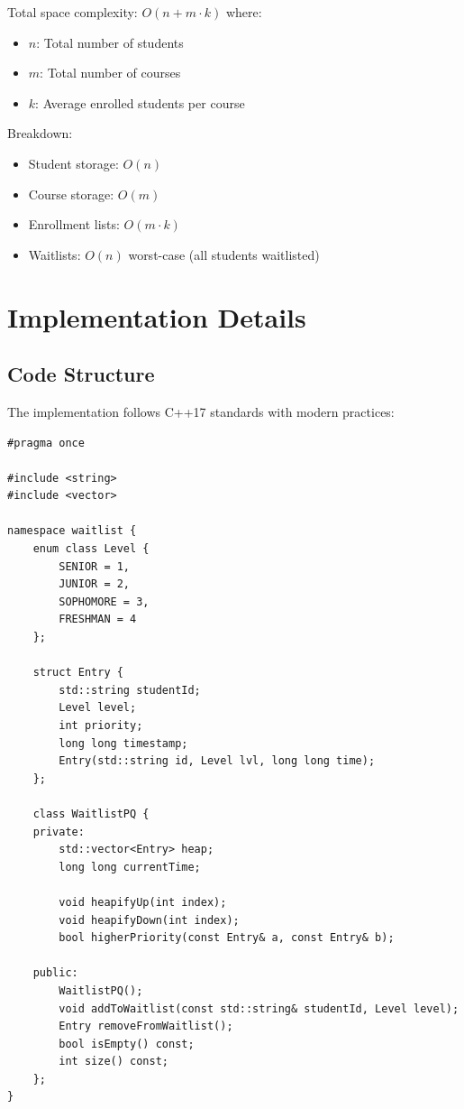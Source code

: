 \documentclass[12pt,a4paper]{article}
\begin{document}
Total space complexity: $O(n + m \cdot k)$ where:
\begin{itemize}
    \item $n$: Total number of students
    \item $m$: Total number of courses
    \item $k$: Average enrolled students per course
\end{itemize}

Breakdown:
\begin{itemize}
    \item Student storage: $O(n)$
    \item Course storage: $O(m)$
    \item Enrollment lists: $O(m \cdot k)$
    \item Waitlists: $O(n)$ worst-case (all students waitlisted)
\end{itemize}

\section{Implementation Details}

\subsection{Code Structure}

The implementation follows C++17 standards with modern practices:

\begin{lstlisting}[caption=WaitlistPQ Header Interface, label=lst:waitlist_header]
#pragma once

#include <string>
#include <vector>

namespace waitlist {
    enum class Level {
        SENIOR = 1,
        JUNIOR = 2,
        SOPHOMORE = 3,
        FRESHMAN = 4
    };

    struct Entry {
        std::string studentId;
        Level level;
        int priority;
        long long timestamp;
        Entry(std::string id, Level lvl, long long time);
    };

    class WaitlistPQ {
    private:
        std::vector<Entry> heap;
        long long currentTime;
        
        void heapifyUp(int index);
        void heapifyDown(int index);
        bool higherPriority(const Entry& a, const Entry& b);
        
    public:
        WaitlistPQ();
        void addToWaitlist(const std::string& studentId, Level level);
        Entry removeFromWaitlist();
        bool isEmpty() const;
        int size() const;
    };
}
\end{lstlisting}
\end{document}
